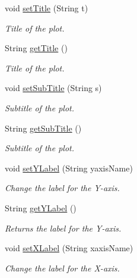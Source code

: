 \begin{DoxyCompactItemize}
void \mbox{\hyperlink{classbridges_1_1base_1_1_line_chart_a893519da804666988c49b918c87da2a2}{set\+Title}} (String t)
\begin{DoxyCompactList}\small\item\em Title of the plot. \end{DoxyCompactList}\item 
String \mbox{\hyperlink{classbridges_1_1base_1_1_line_chart_aedc5f75b158298b755ba0c31bcf84138}{get\+Title}} ()
\begin{DoxyCompactList}\small\item\em Title of the plot. \end{DoxyCompactList}\item 
void \mbox{\hyperlink{classbridges_1_1base_1_1_line_chart_ad24bfdd49194f8e152fdb80e039762ad}{set\+Sub\+Title}} (String s)
\begin{DoxyCompactList}\small\item\em Subtitle of the plot. \end{DoxyCompactList}\item 
String \mbox{\hyperlink{classbridges_1_1base_1_1_line_chart_a102006e90f2a226886538db0eeda6b08}{get\+Sub\+Title}} ()
\begin{DoxyCompactList}\small\item\em Subtitle of the plot. \end{DoxyCompactList}\item 
void \mbox{\hyperlink{classbridges_1_1base_1_1_line_chart_adddccbe77ebd2590f426fab9c8227457}{set\+Y\+Label}} (String yaxis\+Name)
\begin{DoxyCompactList}\small\item\em Change the label for the Y-\/axis. \end{DoxyCompactList}\item 
String \mbox{\hyperlink{classbridges_1_1base_1_1_line_chart_ad3ae17da720b1f89406ab742379ddfd6}{get\+Y\+Label}} ()
\begin{DoxyCompactList}\small\item\em Returns the label for the Y-\/axis. \end{DoxyCompactList}\item 
void \mbox{\hyperlink{classbridges_1_1base_1_1_line_chart_ab402a1134bb79919860368a234f62ea2}{set\+X\+Label}} (String xaxis\+Name)
\begin{DoxyCompactList}\small\item\em Change the label for the X-\/axis. \end{DoxyCompactList}\item 

\end{DoxyCompactItemize}
